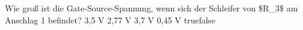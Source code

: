     {Wie groß ist die Gate-Source-Spannung, wenn sich der Schleifer von \$R\_3\$ am Anschlag 1 befindet?}
    {3,5 V}
    {2,77 V}
    {3,7 V}
    {0,45 V}
    {true}{false}